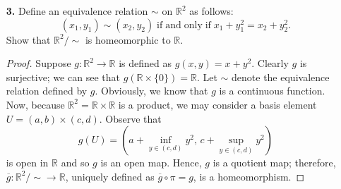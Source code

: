 \documentclass[ 12pt ]{article}
\begin{document}
\begin{enumerate}
\begin{proof}
\begin{enumerate}
					Now, consider two distinct points $$\textbf{p}_1, \textbf{p}_2 = \left ( \cos \theta_1 \sin \phi_1,\, \sin \theta_1 \sin
					\phi_1,\, \cos \phi_1 \right ), \left ( \cos \theta_2 \sin \phi_2,\, \sin \theta_2 \sin \phi_2,\, \cos \phi_2 \right ) \in S^2 \setminus \{ \textbf{k}, -\textbf{k}
					\}.$$ observe that $\gamma : [0, 1] \to S^2 \setminus \{ \textbf{k}, -\textbf{k} \}$ defined as \[ \gamma(t) = \begin{cases} \left ( \cos \theta_1 \sin ( 2(\phi_2 -
					\phi_1)t + \phi_1 ),\, \sin \theta_1 \sin( 2(\phi_2 - \phi_1)t + \phi_1 ),\, \cos( 2(\phi_2 - \phi_1)t + \phi_1 ) \right ); & t \in \left [ 0, \frac{1}{2} \right ), \\
					\left ( \cos( (\theta_2 - \theta_1)(2t - 1) + \theta_1 ) \sin \phi_2,\, \sin( (\theta_2 - \theta_1)(2t - 1) + \theta_1 ) \sin \phi_2,\, \cos \phi_2 \right ); & t \in
					\left [ \frac{1}{2}, 1 \right ] \end{cases} \] is a continuous path from $\textbf{p}_1$ to $\textbf{p}_2$ (in essence, $\gamma$ travels along $\phi$ from $\phi_1$
					and $\phi_2$ on the interval $\left [ 0, \frac{1}{2} \right )$, then travels along $\theta$ from $\theta_1$ to $\theta_2$ on the interval $\left [ \frac{1}{2}, 1
					\right ]$). Then it follows that $S^2 \setminus \{ \textbf{k}, -\textbf{k} \}$ is path connected; however, $S^1 \setminus \{ g(\textbf{k}), g(-\textbf{k}) \}$
					is disconnected as illustrated in lecture, contradicting Theorem 35.5.
			\end{enumerate}
		\end{proof}


	\item[\textbf{3.}] Define an equivalence relation $\sim$ on $\mathbb{R}^2$ as follows: $$(x_1, y_1) \sim (x_2, y_2)\; \mathrm{if\; and\; only\; if}\; x_1 + y_1^2 = x_2 + y_2^2.$$ Show
		that $\mathbb{R}^2/\sim$ is homeomorphic to $\mathbb{R}$.

		\begin{proof}
			Suppose $g : \mathbb{R}^2 \to \mathbb{R}$ is defined as $g(x, y) = x + y^2$. Clearly $g$ is surjective; we can see that $g( \mathbb{R} \times \{ 0 \} ) = \mathbb{R}$. Let
			$\sim$ denote the equivalence relation defined by $g$. Obviously, we know that $g$ is a continuous function. Now, because $\mathbb{R}^2 = \mathbb{R} \times \mathbb{R}$ is
			a product, we may consider a basis element $U = (a, b) \times (c, d)$. Observe that $$g(U) = \left ( a + \inf_{y \in (c, d)} y^2,\, c + \sup_{y \in (c, d)} y^2 \right )$$
			is open in $\mathbb{R}$ and so $g$ is an open map. Hence, $g$ is a quotient map; therefore, $\overline{g} : \mathbb{R}^2/\sim \to \mathbb{R}$, uniquely defined as
			$\overline{g} \circ \pi = g$, is a homeomorphism.
		\end{proof}



\end{enumerate}
\end{document}

